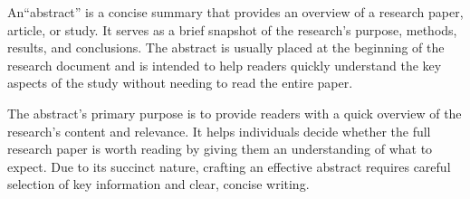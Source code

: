 \begin{abstractENG}
An``abstract'' is a concise summary that provides an overview of a research paper, article, or study. It serves as a brief snapshot of the research's purpose, methods, results, and conclusions. The abstract is usually placed at the beginning of the research document and is intended to help readers quickly understand the key aspects of the study without needing to read the entire paper.

The abstract's primary purpose is to provide readers with a quick overview of the research's content and relevance. It helps individuals decide whether the full research paper is worth reading by giving them an understanding of what to expect. Due to its succinct nature, crafting an effective abstract requires careful selection of key information and clear, concise writing.

\end{abstractENG}

